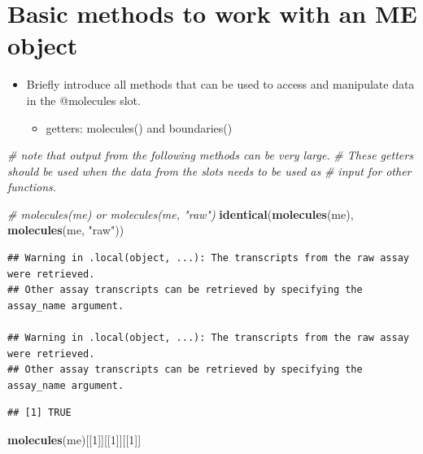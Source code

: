 \documentclass[
]{article}
\newenvironment{Shaded}{\begin{snugshade}}{\end{snugshade}}
\newcommand{\CommentTok}[1]{\textcolor[rgb]{0.56,0.35,0.01}{\textit{#1}}}
\newcommand{\DecValTok}[1]{\textcolor[rgb]{0.00,0.00,0.81}{#1}}
\newcommand{\KeywordTok}[1]{\textcolor[rgb]{0.13,0.29,0.53}{\textbf{#1}}}
\newcommand{\NormalTok}[1]{#1}
\newcommand{\StringTok}[1]{\textcolor[rgb]{0.31,0.60,0.02}{#1}}
\providecommand{\tightlist}{%
  \setlength{\itemsep}{0pt}\setlength{\parskip}{0pt}}
\begin{document}
\hypertarget{basic-methods-to-work-with-an-me-object}{%
\section{Basic methods to work with an ME
object}\label{basic-methods-to-work-with-an-me-object}}

\begin{itemize}
\item
  Briefly introduce all methods that can be used to access and
  manipulate data in the @molecules slot.

  \begin{itemize}
  \tightlist
  \item
    getters: molecules() and boundaries()
  \end{itemize}
\end{itemize}

\begin{Shaded}
\begin{Highlighting}[]
\CommentTok{\# note that output from the following methods can be very large.}
\CommentTok{\# These getters should be used when the data from the slots needs to be used as}
\CommentTok{\# input for other functions.}

\CommentTok{\# molecules(me) or molecules(me, "raw")}
\KeywordTok{identical}\NormalTok{(}\KeywordTok{molecules}\NormalTok{(me), }\KeywordTok{molecules}\NormalTok{(me, }\StringTok{"raw"}\NormalTok{))}
\end{Highlighting}
\end{Shaded}

\begin{verbatim}
## Warning in .local(object, ...): The transcripts from the raw assay were retrieved.
## Other assay transcripts can be retrieved by specifying the assay_name argument.

## Warning in .local(object, ...): The transcripts from the raw assay were retrieved.
## Other assay transcripts can be retrieved by specifying the assay_name argument.
\end{verbatim}

\begin{verbatim}
## [1] TRUE
\end{verbatim}

\begin{Shaded}
\begin{Highlighting}[]
\KeywordTok{molecules}\NormalTok{(me)[[}\DecValTok{1}\NormalTok{]][[}\DecValTok{1}\NormalTok{]][[}\DecValTok{1}\NormalTok{]]}
\end{Highlighting}
\end{Shaded}
\end{document}
